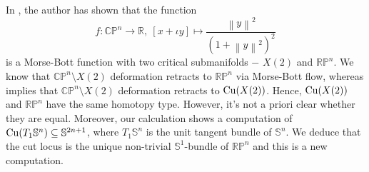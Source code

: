 \begin{rem}
	In \cite[\S 2.2]{Aud05}, the author has shown that the function
	\begin{displaymath}
		f:\mathbb{CP}^n\to \mathbb{R},~[x+\iota y]\mapsto \dfrac{\left\|y\right\|^2}{\left(1+\left\|y\right\|^2\right)^2} 
	\end{displaymath}
	is a Morse-Bott function with two critical submanifolds $-$ $X(2)$ and $\mathbb{RP}^n$. We know that $\mathbb{CP}^n\setminus X(2)$ deformation retracts to $\mathbb{RP}^n$ via Morse-Bott flow, whereas  implies that $\mathbb{CP}^n\setminus X(2)$ deformation retracts to $\cutn[X(2)]$. Hence, $\cutn[X(2)]$ and $\mathbb{RP}^n$  have the same homotopy type. However, it's not a priori clear whether they are equal. Moreover, our calculation shows a computation of $\cutn[T_1\mathbb{S}^n] \subseteq \mathbb{S}^{2n+1}$, where $T_1\mathbb{S}^n$ is the unit tangent bundle of $\mathbb{S}^n$.   We deduce that the cut locus is the unique non-trivial $\mathbb{S}^1$-bundle of $\mathbb{RP}^n$ and this  is a new computation.
\end{rem}